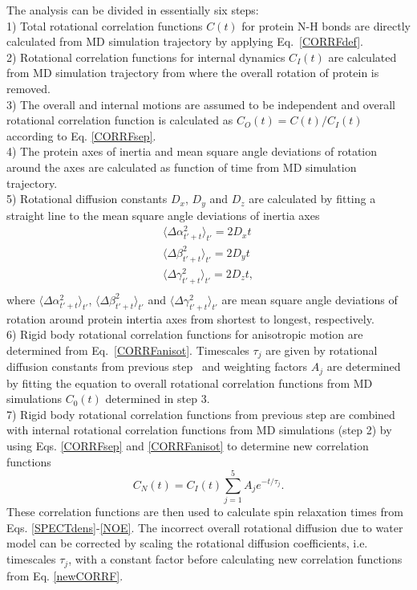 \documentclass[pre,aps,floatfix,authordate1-4,twocolumn]{revtex4-1}
\begin{document}
The analysis can be divided in essentially six steps: \\
1) Total rotational correlation functions $C(t)$
for protein N-H bonds are directly calculated from MD simulation trajectory
by applying Eq.~\ref{CORRFdef}. \\
2) Rotational correlation functions for internal
dynamics $C_I(t)$ are calculated from MD simulation trajectory from where the overall
rotation of protein is removed. \\
3) The overall and internal motions are assumed to be independent and overall
rotational correlation function is calculated as $C_O(t)=C(t)/C_I(t)$ according to Eq. \ref{CORRFsep}. \\
4) The protein axes of inertia and mean square angle deviations of rotation around the axes
are calculated as function of time from MD simulation trajectory. \\
5) Rotational diffusion constants $D_x$, $D_y$ and $D_z$ are calculated by fitting a straight line
to the mean square angle deviations of inertia axes 
\begin{equation}\label{DIFFdef}
  \begin{aligned}
    \langle \Delta \alpha_{t'+t}^2 \rangle_{t'} = 2 D_{x} t \\
    \langle \Delta \beta_{t'+t}^2 \rangle_{t'} = 2 D_{y} t \\
    \langle \Delta \gamma_{t'+t}^2 \rangle_{t'} = 2 D_{z} t, \\
  \end{aligned}
\end{equation}
where $\langle \Delta \alpha_{t'+t}^2 \rangle_{t'}$,
$\langle \Delta \beta_{t'+t}^2 \rangle_{t'}$ and
$\langle \Delta \gamma_{t'+t}^2 \rangle_{t'}$ are mean
square angle deviations of rotation around protein intertia axes
from shortest to longest, respectively.\\
6) Rigid body rotational correlation functions for anisotropic motion
are determined from Eq.~\ref{CORRFanisot}. Timescales $\tau_j$ are given by
rotational diffusion constants from previous step~\cite{Note1} and weighting
factors $A_j$ are determined by fitting the equation to overall
rotational correlation functions from MD simulations $C_0(t)$ determined in step 3. \\
7) Rigid body rotational correlation functions from previous step
are combined with internal rotational correlation functions from MD simulations (step 2)
by using Eqs. \ref{CORRFsep} and \ref{CORRFanisot} to determine
new correlation functions
\begin{equation}\label{newCORRF}
  C_N(t)=C_I(t)\sum_{j=1}^5 A_j e^{-t/\tau_j}.
\end{equation}
These correlation functions are then used to calculate spin relaxation times
from Eqs. \ref{SPECTdens}-\ref{NOE}. The incorrect overall rotational
diffusion due to water model can be corrected  by scaling the rotational diffusion
coefficients, i.e. timescales $\tau_j$, with a constant factor before calculating
new correlation functions from Eq. \ref{newCORRF}.
\end{document}

